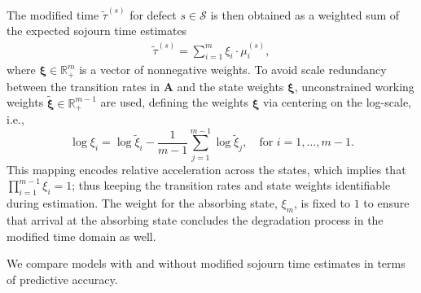 
The modified time $\widetilde{\tau}^{(s)}$ for defect $s \in \mathcal S$ is then obtained as a weighted sum of the expected sojourn time estimates
\begin{align}
\widetilde\tau^{(s)}= \sum_{i = 1}^m \xi_i  \cdot \mu_i^{(s)}, \label{eq:warped_time}
\end{align}
where $\bm{\xi} \in \mathbb{R}_+^m$ is a vector of nonnegative weights. 
To avoid scale redundancy between the transition rates in $\bm A$ and the state weights $\bm\xi$, unconstrained working weights $\widetilde{\bm\xi}\in\mathbb{R}_+^{m-1}$ are used, defining the weights $\bm\xi$ via centering on the log-scale, i.e.,
$$
 \log \xi_i = \log\widetilde{\xi}_i - \frac{1}{m-1}\sum_{j=1}^{m-1}\log\widetilde{\xi}_j, \quad \text{for } i = 1, \dots, m-1.
$$
This mapping encodes relative acceleration across the states, which implies that $\prod_{i = 1}^{m-1} \xi_i = 1$; thus keeping the transition rates and state weights identifiable during estimation.
The weight for the absorbing state, $\xi_m$, is fixed to $1$ to ensure that arrival at the absorbing state concludes the degradation process in the modified time domain as well.

We compare models with and without modified sojourn time estimates in terms of predictive accuracy. %



